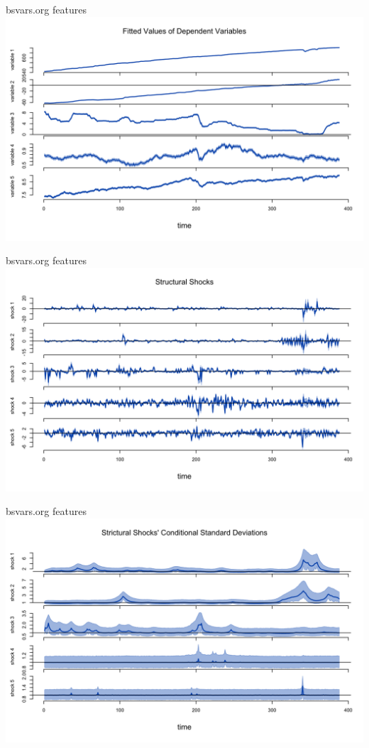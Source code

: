 \documentclass[aspectratio=1610,notes,blackandwhite,mathsans,usenames,dvipsnames]{beamer}
\begin{document}
	
	\begin{frame}{\huge bsvars.org features}
		\centering
		\includegraphics[scale=0.25]{bs_fit}
	\end{frame}
	
	
	\begin{frame}{\huge bsvars.org features}
		\centering
		\includegraphics[scale=0.25]{bs_ss}
	\end{frame}
	

	
	\begin{frame}{\huge bsvars.org features}
		\centering
		\includegraphics[scale=0.25]{bs_sds}
	\end{frame}
	
\end{document}
